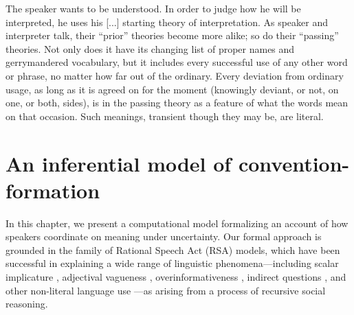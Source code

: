 \begin{savequote}[125mm]
    The speaker wants to be understood. %
    In order to judge how he will be interpreted, he uses his [...] starting theory of interpretation. %
As speaker and interpreter talk, their ``prior'' theories become more alike; so do their ``passing'' theories. %
Not only does it have its changing list of proper names and gerrymandered vocabulary, but it includes every successful use of any other word or phrase, no matter how far out of the ordinary. 
Every deviation from ordinary usage, as long as it is agreed on for the moment (knowingly deviant, or not, on one, or both, sides), is in the passing theory as a feature of what the words mean on that occasion. 
Such meanings, transient though they may be, are literal.
\end{savequote}

\chapter{An inferential model of convention-formation}
\graphicspath{{./figures/modeling/}}

In this chapter, we present a computational model formalizing an account of how speakers coordinate on meaning under uncertainty. 
Our formal approach is grounded in the family of Rational Speech Act (RSA) models, which have been successful in explaining a wide range of linguistic phenomena---including scalar implicature \cite{GoodmanStuhlmuller13_KnowledgeImplicature}, adjectival vagueness \cite{LassiterGoodman15_AdjectivalVagueness}, overinformativeness \cite{degen2019redundancy}, indirect questions \cite{hawkins_why_2015}, and other non-literal language use \cite{KaoWuBergenGoodman14_NonliteralNumberWords}---as arising from a process of recursive social reasoning.%

